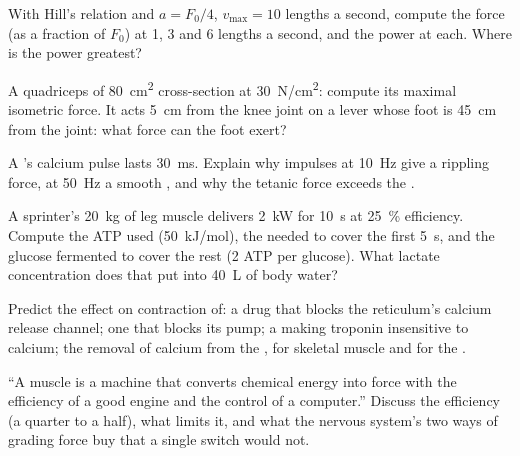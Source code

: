 \begin{exercise}[$\star\star$]\label{exo:b2:muscle-movement:7}
With Hill's relation and $a = F_0/4$, $v_{\max} = 10$ lengths a
second, compute the force (as a fraction of $F_0$) at 1, 3 and 6
lengths a second, and the power at each. Where is the power greatest?
\end{exercise}

\begin{exercise}[$\star\star$]\label{exo:b2:muscle-movement:8}
A quadriceps of \qty{80}{cm^2} cross-section at \qty{30}{N/cm^2}:
compute its maximal isometric force. It acts \qty{5}{cm} from the
knee joint on a lever whose foot is \qty{45}{cm} from the joint:
what force can the foot exert?
\end{exercise}

\begin{exercise}[$\star\star$]\label{exo:b2:muscle-movement:9}
A 's calcium pulse lasts \qty{30}{ms}. Explain why impulses
at \qty{10}{Hz} give a rippling force, at \qty{50}{Hz} a smooth
, and why the tetanic force exceeds the .
\end{exercise}

\begin{exercise}[$\star\star\star$]\label{exo:b2:muscle-movement:10}
A sprinter's \qty{20}{kg} of leg muscle delivers \qty{2}{kW} for
\qty{10}{s} at \qty{25}{\%} efficiency. Compute the ATP used (\qty{50}{kJ/mol}),
the  needed to cover the first \qty{5}{s}, and
the glucose fermented to cover the rest (2 ATP per glucose). What
lactate concentration does that put into \qty{40}{L} of body water?
\end{exercise}

\begin{exercise}[$\star\star\star$]\label{exo:b2:muscle-movement:11}
Predict the effect on contraction of: a drug that blocks the
reticulum's calcium release channel; one that blocks its pump; a
 making troponin insensitive to calcium; the removal of
calcium from the , for skeletal muscle and for the .
\end{exercise}

\begin{exercise}[$\star\star\star$]\label{exo:b2:muscle-movement:12}
``A muscle is a machine that converts chemical energy into force
with the efficiency of a good engine and the control of a
computer.'' Discuss the efficiency (a quarter to a half), what
limits it, and what the nervous system's two ways of grading force
buy that a single switch would not.
\end{exercise}

